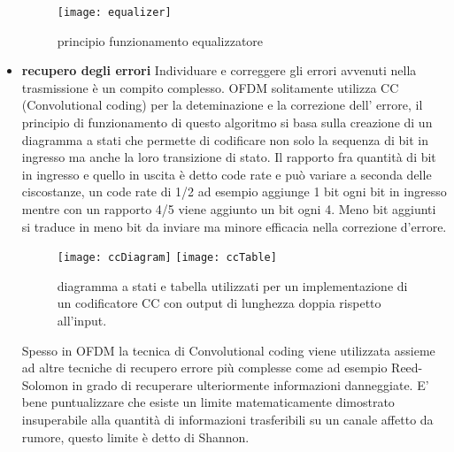 \begin{itemize}
     \begin{figure}[h]
     	\centering
     	\texttt{[image: equalizer]}
     	\caption{principio funzionamento equalizzatore \cite{equalizer}}\label{fig:1}
     \end{figure}
 \item \textbf{recupero degli errori} Individuare e correggere gli errori avvenuti nella trasmissione è un compito complesso. OFDM solitamente utilizza CC (Convolutional coding) per la deteminazione e la correzione dell' errore, il principio di funzionamento di questo algoritmo si basa sulla creazione di un diagramma a stati che permette di codificare non solo la sequenza di bit in ingresso ma anche la loro transizione di stato. Il rapporto fra quantità di bit in ingresso e quello in uscita è detto code rate e può variare a seconda delle ciscostanze, un code rate di 1/2 ad esempio aggiunge 1 bit ogni bit in ingresso mentre con un rapporto 4/5 viene aggiunto un bit ogni 4. Meno bit aggiunti si traduce in meno bit da inviare ma minore efficacia nella correzione d'errore.
 \cite{cc}
	 \begin{figure}[h]
	 	\centering
	 	\texttt{[image: ccDiagram]}
	 	\texttt{[image: ccTable]}
	 	\caption{diagramma a stati e tabella utilizzati per un implementazione di un codificatore CC con output di lunghezza doppia rispetto all'input.}\label{fig:1}
	 \end{figure}
 Spesso in OFDM la tecnica di Convolutional coding viene utilizzata assieme ad altre tecniche di recupero errore più complesse come ad esempio Reed-Solomon in grado di recuperare ulteriormente informazioni danneggiate.
 E' bene puntualizzare che esiste un limite matematicamente dimostrato insuperabile alla quantità di informazioni trasferibili su un canale affetto da rumore, questo limite è detto di Shannon.
 \cite{ofdmWiki}
\label{sec:problem}

\end{itemize}
